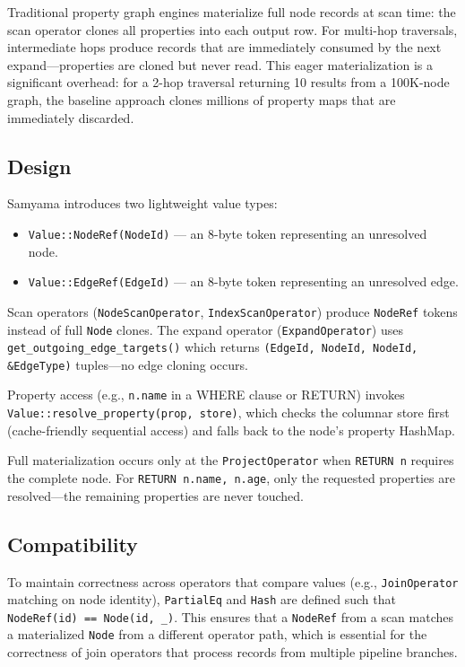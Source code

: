 \documentclass[sigconf, nonacm]{acmart}
\begin{document}
Traditional property graph engines materialize full node records at scan time: the scan operator clones all properties into each output row.
For multi-hop traversals, intermediate hops produce records that are immediately consumed by the next expand---properties are cloned but never read.
This eager materialization is a significant overhead: for a 2-hop traversal returning 10 results from a 100K-node graph, the baseline approach clones millions of property maps that are immediately discarded.

\subsection{Design}

Samyama introduces two lightweight value types:

\begin{itemize}[leftmargin=*]
  \item \texttt{Value::NodeRef(NodeId)} --- an 8-byte token representing an unresolved node.
  \item \texttt{Value::EdgeRef(EdgeId)} --- an 8-byte token representing an unresolved edge.
\end{itemize}

\noindent
Scan operators (\texttt{NodeScanOperator}, \texttt{IndexScanOperator}) produce \texttt{NodeRef} tokens instead of full \texttt{Node} clones.
The expand operator (\texttt{ExpandOperator}) uses \texttt{get\_outgoing\_edge\_targets()} which returns \texttt{(EdgeId, NodeId, NodeId, \&EdgeType)} tuples---no edge cloning occurs.

Property access (e.g., \texttt{n.name} in a WHERE clause or RETURN) invokes \texttt{Value::resolve\_property(prop, store)}, which checks the columnar store first (cache-friendly sequential access) and falls back to the node's property HashMap.

Full materialization occurs only at the \texttt{ProjectOperator} when \texttt{RETURN n} requires the complete node.
For \texttt{RETURN n.name, n.age}, only the requested properties are resolved---the remaining properties are never touched.

\subsection{Compatibility}

To maintain correctness across operators that compare values (e.g., \texttt{JoinOperator} matching on node identity), \texttt{PartialEq} and \texttt{Hash} are defined such that \texttt{NodeRef(id) == Node(id, \_)}.
This ensures that a \texttt{NodeRef} from a scan matches a materialized \texttt{Node} from a different operator path, which is essential for the correctness of join operators that process records from multiple pipeline branches.
\end{document}
